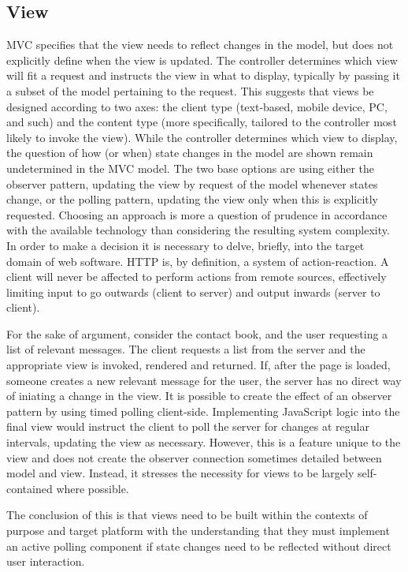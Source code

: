 \subsection{View}
MVC specifies that the view needs to reflect changes in the model, but does not explicitly define when the view is updated.
The controller determines which view will fit a request and instructs the view in what to display, typically by passing it a subset of the model pertaining to the request. This suggests that views be designed according to two axes: the client type (text-based, mobile device, PC, and such) and the content type (more specifically, tailored to the controller most likely to invoke the view). While the controller determines which view to display, the question of how (or when) state changes in the model are shown remain undetermined in the MVC model. The two base options are using either the observer pattern, updating the view by request of the model whenever states change, or the polling pattern, updating the view only when this is explicitly requested. Choosing an approach is more a question of prudence in accordance with the available technology than considering the resulting system complexity. In order to make a decision it is necessary to delve, briefly, into the target domain of web software. HTTP is, by definition, a system of action-reaction. A client will never be affected to perform actions from remote sources, effectively limiting input to go outwards (client to server) and output inwards (server to client).

For the sake of argument, consider the contact book, and the user requesting a list of relevant messages. The client requests a list from the server and the appropriate view is invoked, rendered and returned. If, after the page is loaded, someone creates a new relevant message for the user, the server has no direct way of iniating a change in the view.
It is possible to create the effect of an observer pattern by using timed polling client-side. Implementing JavaScript logic into the final view would instruct the client to poll the server for changes at regular intervals, updating the view as necessary. However, this is a feature unique to the view and does not create the observer connection sometimes detailed between model and view. Instead, it stresses the necessity for views to be largely self-contained where possible.

The conclusion of this is that views need to be built within the contexts of purpose and target platform with the understanding that they must implement an active polling component if state changes need to be reflected without direct user interaction.
